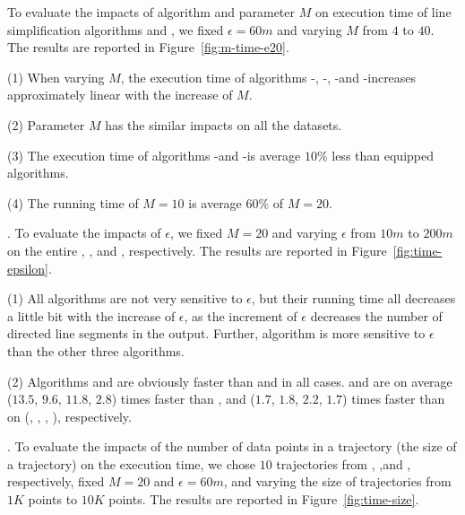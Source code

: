 To evaluate the impacts of algorithm \rpia and parameter $M$ on execution time of line simplification algorithms \cist and \cista, we fixed $\epsilon =60m$ and varying $M$ from $4$ to $40$.
%
The results are reported in Figure~\ref{fig:m-time-e20}. %

\ni(1) When varying $M$, the execution time of algorithms \cist-\rpia, \cist-\cpia, \cista-\rpia and \cista-\cpia increases approximately linear with the increase of $M$.

\ni(2) Parameter $M$ has the similar impacts on all the datasets.

\ni(3) The execution time of algorithms \cist-\rpia and \cista-\rpia is average \textcolor[rgb]{1.00,0.00,0.00}{$10\%$} less than \cpia equipped algorithms.

\ni(4) The running time of $M=10$ is average \textcolor[rgb]{1.00,0.00,0.00}{$60\%$} of $M=20$.


.
To evaluate the impacts of $\epsilon$, we fixed $M=20$ and varying $\epsilon$  from $10m$ to $200m$ on the entire \truck, \sercar, \geolife and \pricar, respectively.
The results are reported in Figure~\ref{fig:time-epsilon}.

\ni(1) All algorithms are not very sensitive to $\epsilon$, but their running time all decreases a little bit with the increase of $\epsilon$, as the increment of $\epsilon$ decreases the number of directed line segments in the output.
Further, algorithm \dpa is more sensitive to $\epsilon$ than the other three algorithms.

\ni\textcolor[rgb]{1.00,0.00,0.00}{(2)} Algorithms \cist and \cista are obviously faster than \dpa and \squishe in all cases.
\cist and \cista are on average ($13.5$, $9.6$, $11.8$, {$2.8$}) times faster than \dpa, and {($1.7$, $1.8$, $2.2$, {$1.7$}) times faster} than \squishe on (\truck, \sercar, {\geolife}, \pricar), respectively.


.
To evaluate the impacts of the number of data points in a trajectory (\ie the size of a trajectory) on the execution time,
we chose {$10$} trajectories from \truck, \sercar,\geolife and \pricar, respectively,
fixed $M=20$ and $\epsilon = 60m$, and varying the size  of trajectories from $1K$ points to $10K$ points.
%
The results are reported in Figure~\ref{fig:time-size}.


